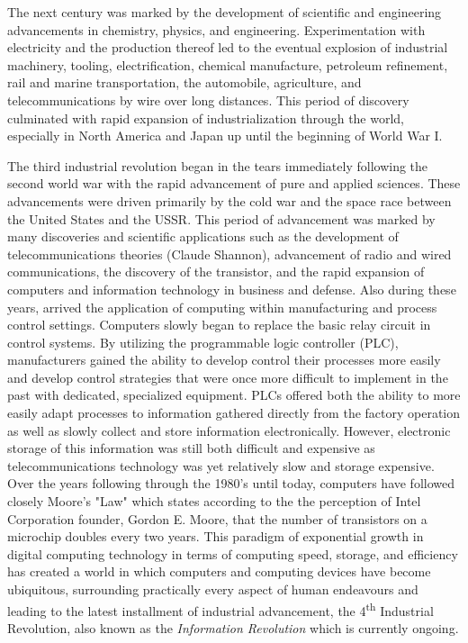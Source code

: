 \documentclass[english]{spimubphdthesis}
\begin{document}
The next century was marked by the development of scientific and engineering advancements in chemistry, physics, and engineering. Experimentation with electricity and the production thereof led to the eventual explosion of industrial machinery, tooling, electrification, chemical manufacture, petroleum refinement, rail and marine transportation, the automobile, agriculture, and telecommunications by wire over long distances.  This period of discovery culminated with rapid expansion of industrialization through the world, especially in North America and Japan up until the beginning of World War I.

The third industrial revolution began in the tears immediately following the second world war with the rapid advancement of pure and applied sciences.  These advancements were driven primarily by the cold war and the space race between the United States and the USSR.  This period of advancement was marked by many discoveries and scientific applications such as the development of telecommunications theories (Claude Shannon), advancement of radio and wired communications, the discovery of the transistor, and the rapid expansion of computers and information technology in business and defense.  Also during these years, arrived the application of computing within manufacturing and process control settings. Computers slowly began to replace the basic relay circuit in control systems.  By utilizing the programmable logic controller (PLC), manufacturers gained the ability to develop control their processes more easily and develop control strategies that were once more difficult to implement in the past with dedicated, specialized equipment.  PLCs offered both the ability to more easily adapt processes to information gathered directly from the factory operation as well as slowly collect and store information electronically.  However, electronic storage of this information was still both difficult and expensive as telecommunications technology was yet relatively slow and storage expensive.  Over the years following through the 1980's until today, computers have followed closely Moore's "Law" which states according to the the perception of Intel Corporation founder, Gordon E. Moore, that the number of transistors on a microchip doubles every two years.  This paradigm of exponential growth in digital computing technology in terms of computing speed, storage, and efficiency has created a world in which computers and computing devices have become ubiquitous, surrounding practically every aspect of human endeavours and leading to the latest installment of industrial advancement, the 4\textsuperscript{th} Industrial Revolution, also known as the \textit{Information Revolution} which is currently ongoing. 
\end{document}
